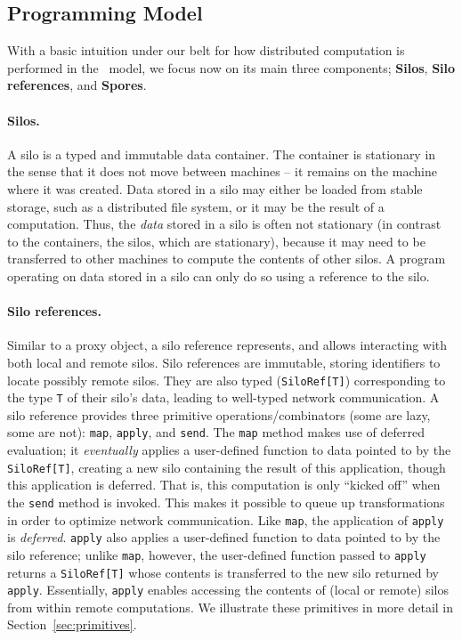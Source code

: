 \documentclass{jfp1}
\begin{document}
\subsection{Programming Model}
\label{sec:programming-model}

With a basic intuition under our belt for how distributed computation is 
performed in the \FP~model, we focus now on its main three components; 
\textbf{Silos}, \textbf{Silo references}, and \textbf{Spores}.


\paragraph{Silos.}

A silo is a typed and immutable data container. The container is
stationary in the sense that it does not move between machines -- it
remains on the machine where it was created. Data stored in a silo may
either be loaded from stable storage, such as a distributed file
system, or it may be the result of a computation. Thus, the {\em data}
stored in a silo is often not stationary (in contrast to the
containers, the silos, which are stationary), because it may need to
be transferred to other machines to compute the contents of other
silos. A program operating on data stored in a silo can only do so
using a reference to the silo.

\paragraph{Silo references.}

Similar to a proxy object, a silo reference represents, and allows interacting
with both local and remote silos. Silo references are immutable, storing
identifiers to locate possibly remote silos. They are also typed
(\verb|SiloRef[T]|) corresponding to the type \verb|T| of their silo's data,
leading to well-typed network communication. A silo reference provides three
primitive operations/combinators (some are lazy, some are not): \verb|map|,
\verb|apply|, and \verb|send|. The \verb|map| method makes use of deferred
evaluation; it {\em eventually} applies a user-defined function to data pointed
to by the \verb|SiloRef[T]|, creating a new silo containing the result of this
application, though this application is deferred. That is, this computation is only ``kicked
off'' when the \verb|send| method is invoked. This makes it possible to queue up
transformations in order to optimize network communication. Like \verb|map|, the
application of \verb|apply| is {\em deferred}. \verb|apply| also applies a
user-defined function to data pointed to by the silo reference; unlike
\verb|map|, however, the user-defined function passed to \verb|apply| returns
a \verb|SiloRef[T]| whose contents is transferred to the new silo returned by
\verb|apply|. Essentially, \verb|apply| enables accessing the contents of
(local or remote) silos from within remote computations. We illustrate these
primitives in more detail in Section~\ref{sec:primitives}.
\end{document}
